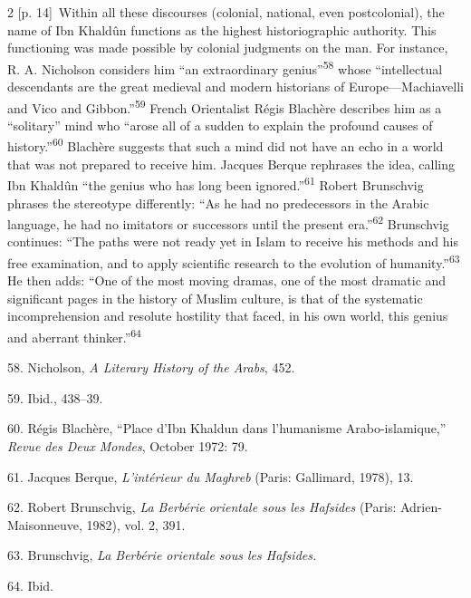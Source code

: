 \documentclass[10pt,a4paper]{article}
\begin{document}
\begin{paracol}{2}
{\scriptsize\color{gray} [p. 14]}\ Within all these discourses (colonial, national, even postcolonial), the name of Ibn Khaldûn functions as the highest historiographic authority. This functioning was made possible by colonial judgments on the man. For instance, R. A. Nicholson considers him “an extraordinary genius”\nobreak\textsuperscript{58} whose “intellectual descendants are the great medieval and modern historians of Europe—Machiavelli and Vico and Gibbon.”\nobreak\textsuperscript{59} French Orientalist Régis Blachère describes him as a “solitary” mind who “arose all of a sudden to explain the profound causes of history.”\nobreak\textsuperscript{60} Blachère suggests that such a mind did not have an echo in a world that was not prepared to receive him. Jacques Berque rephrases the idea, calling Ibn Khaldûn “the genius who has long been ignored.”\nobreak\textsuperscript{61} Robert Brunschvig phrases the stereotype differently: “As he had no predecessors in the Arabic language, he had no imitators or successors until the present era.”\nobreak\textsuperscript{62} Brunschvig continues: “The paths were not ready yet in Islam to receive his methods and his free examination, and to apply scientific research to the evolution of humanity.”\nobreak\textsuperscript{63} He then adds: “One of the most moving dramas, one of the most dramatic and significant pages in the history of Muslim culture, is that of the systematic incomprehension and resolute hostility that faced, in his own world, this genius and aberrant thinker.”\nobreak\textsuperscript{64}\par{\small 58. Nicholson, \textit{A Literary History of the Arabs}, 452.\par}{\small 59. Ibid., 438–39.\par}{\small 60. Régis Blachère, “Place d’Ibn Khaldun dans l’humanisme Arabo-islamique,” \textit{Revue des Deux Mondes}, October 1972: 79.\par}{\small 61. Jacques Berque, \textit{L’intérieur du Maghreb} (Paris: Gallimard, 1978), 13.\par}{\small 62. Robert Brunschvig, \textit{La Berbérie orientale sous les Hafsides} (Paris: Adrien-Maisonneuve, 1982), vol. 2, 391.\par}{\small 63. Brunschvig, \textit{La Berbérie orientale sous les Hafsides.}\par}{\small 64. Ibid.\par}
\switchcolumn*

\end{paracol}
\end{document}
